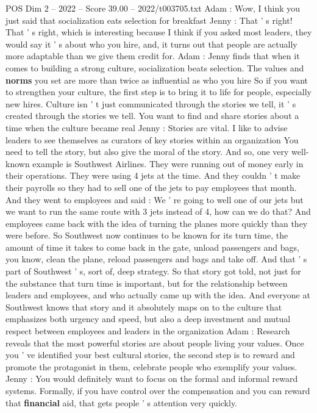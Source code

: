 \begin{textsample}{POS Dim 2 – 2022 – Score 39.00 – 2022/t003705.txt}
Adam : Wow, I think you just said that socialization eats selection for breakfast Jenny : That ' s right!
That ' s right, which is interesting because I think if you asked most leaders, they would say it ' s about who you hire, and, it turns out that people are actually more adaptable than we give them credit for.
Adam : Jenny finds that when it comes to building a strong culture, socialization beats selection.
The values and \textbf{norms} you set are more than twice as influential as who you hire So if you want to strengthen your culture, the first step is to bring it to life for people, especially new hires.
Culture isn ' t just communicated through the stories we tell, it ' s created through the stories we tell.
You want to find and share stories about a time when the culture became real Jenny : Stories are vital.
I like to advise leaders to see themselves as curators of key stories within an organization You need to tell the story, but also give the moral of the story.
And so, one very well-known example is Southwest Airlines.
They were running out of money early in their operations.
They were using 4 jets at the time.
And they couldn ' t make their payrolls so they had to sell one of the jets to pay employees that month.
And they went to employees and said : We ' re going to well one of our jets but we want to run the same route with 3 jets instead of 4, how can we do that?
And employees came back with the idea of turning the planes more quickly than they were before.
So Southwest now continues to be known for its turn time, the amount of time it takes to come back in the gate, unload passengers and bags, you know, clean the plane, reload passengers and bags and take off.
And that ' s part of Southwest ' s, sort of, deep strategy.
So that story got told, not just for the substance that turn time is important, but for the relationship between leaders and employees, and who actually came up with the idea.
And everyone at Southwest knows that story and it absolutely maps on to the culture that emphasizes both urgency and speed, but also a deep investment and mutual respect between employees and leaders in the organization Adam : Research reveals that the most powerful stories are about people living your values.
Once you ' ve identified your best cultural stories, the second step is to reward and promote the protagonist in them, celebrate people who exemplify your values.
Jenny : You would definitely want to focus on the formal and informal reward systems.
Formally, if you have control over the compensation and you can reward that \textbf{financial} aid, that gets people ' s attention very quickly.

\end{textsample}
